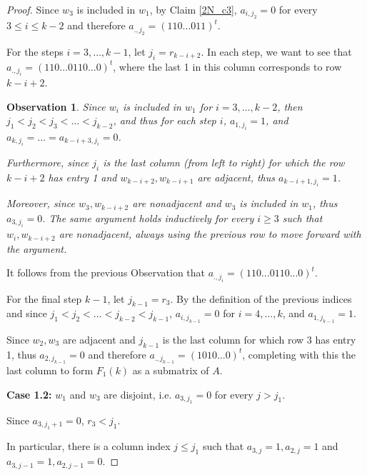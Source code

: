 \documentclass[a4paper,10pt]{report}
\theoremstyle{plain}
\theoremstyle{remark}
\theoremstyle{plain}
\newtheorem{obs}{Observation}
\begin{document}
\begin{proof}
	Since $w_3$ is included in $w_1$, by Claim \ref{2N_c3}, $a_{i,j_2} = 0$ for every $3 \leq i \leq k-2$ and therefore $a_{.,j_2} = ( 1 1 0 ... 0 1 1)^{t}$. 
	
	\vspace{.5mm}
	For the steps $i =3, \ldots, k-1$, let $j_i = r_{k-i+2}$. 
	In each step, we want to see that $a_{.,j_i} = ( 1 1 0 ... 0 1 1 0 ... 0)^{t}$, where the last 1 in this column
	corresponds to row $k-i+2$.
	
	\begin{obs}
		Since $w_i$ is included in $w_1$ for $i = 3, \ldots, k-2$, then $j_1 < j_2 < j_3 < \ldots < j_{k-2}$, 
		and thus for each step $i$, $a_{1,j_i} = 1$, and $a_{k,j_i} = \ldots = a_{k-i+3,j_i} = 0$.
		
		Furthermore, since $j_i$ is the last column (from left to right) for which the row $k-i+2$ has entry 1 and $w_{k-i+2}, w_{k-i+1}$ are adjacent,
		thus $a_{k-i+1,j_i} = 1$.
		
		Moreover, since $w_3, w_{k-i+2}$ are nonadjacent and $w_3$ is included in $w_1$, thus $a_{3,j_i} = 0$. The same argument holds inductively
		for every $i \geq 3$ such that $w_i, w_{k-i+2}$ are nonadjacent, always using the previous row to move forward with the argument.
	\end{obs}
	
	It follows from the previous Observation that $a_{.,j_i} = ( 1 1 0 ... 0 1 1 0 ... 0)^{t}$.
	
	\vspace{.5mm}
	For the final step $k-1$, let $j_{k-1} = r_3$.
	By the definition of the previous indices and since $j_1 < j_2 < \ldots < j_{k-2} < j_{k-1}$, 
	$a_{i,j_{k-1}} = 0$ for $i= 4, \ldots, k$, and $a_{1,j_{k-1}} = 1$.
	
	Since $w_2, w_3$ are adjacent and $j_{k-1}$ is the last column for which row $3$ has entry 1, thus $a_{2,j_{k-1}} = 0$
	and therefore $a_{.,j_{k-1}} = ( 1 0 1 0 ... 0 )^{t}$, completing with this the last column 
	to form $F_1(k)$ as a submatrix of $A$.
		
	\vspace{1mm}
	\textbf{Case 1.2:} $w_1$ and $w_3$ are disjoint, i.e. $a_{3, j_1} =0$ for every $j > j_1$.
	
	\vspace{.5mm}
	Since $a_{3,j_1 +1} = 0$, $r_3 < j_1$.
	
	In particular, there is a column index $j \leq j_1$ such that $a_{3,j} = 1, a_{2,j} = 1$ and $a_{3,j-1} = 1, a_{2,j-1} = 0$.
	

\end{proof}
\end{document}

